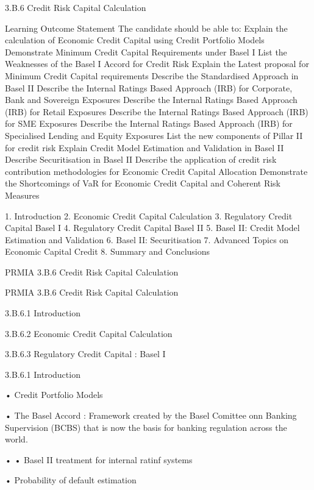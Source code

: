 3.B.6 Credit Risk Capital Calculation

Learning Outcome Statement
The candidate should be able to:
 Explain the calculation of Economic Credit Capital using Credit
Portfolio Models
 Demonstrate Minimum Credit Capital Requirements under Basel I
 List the Weaknesses of the Basel I Accord for Credit Risk
 Explain the Latest proposal for Minimum Credit Capital requirements
 Describe the Standardised Approach in Basel II
 Describe the Internal Ratings Based Approach (IRB) for Corporate, Bank and
Sovereign Exposures
 Describe the Internal Ratings Based Approach (IRB) for Retail Exposures
 Describe the Internal Ratings Based Approach (IRB) for SME Exposures
 Describe the Internal Ratings Based Approach (IRB) for Specialised Lending
and Equity Exposures
 List the new components of Pillar II for credit risk
 Explain Credit Model Estimation and Validation in Basel II
 Describe Securitisation in Basel II
 Describe the application of credit risk contribution methodologies for
Economic Credit Capital Allocation
 Demonstrate the Shortcomings of VaR for Economic Credit Capital and
Coherent Risk Measures


1. Introduction
2. Economic Credit Capital Calculation
3. Regulatory Credit Capital Basel I
4. Regulatory Credit Capital Basel II
5. Basel II: Credit Model Estimation and Validation
6. Basel II: Securitisation
7. Advanced Topics on Economic Capital Credit
8. Summary and Conclusions

\newpage

PRMIA 3.B.6 Credit Risk Capital Calculation

PRMIA 3.B.6 Credit Risk Capital Calculation

3.B.6.1 Introduction

3.B.6.2 Economic Credit Capital Calculation

3.B.6.3 Regulatory Credit Capital : Basel I


3.B.6.1 Introduction

•
Credit Portfolio Models

•
The Basel Accord : Framework created by the Basel Comittee onn Banking Supervision (BCBS) that is now the basis for banking regulation across the world.

•
•
Basel II treatment for internal ratinf systems

•
Probability of default estimation


